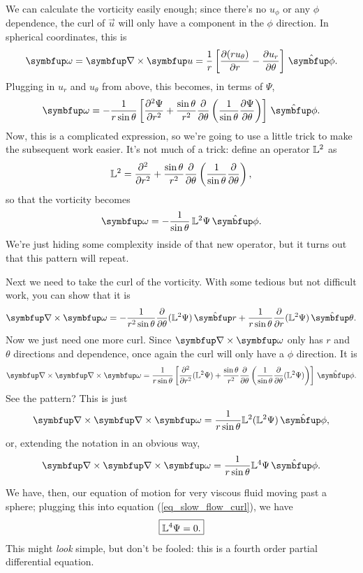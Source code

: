We can calculate the vorticity easily enough; since there's no $u_\phi$ or any $\phi$ dependence, the curl of $\vec{u}$ will only have a component in the $\unit{\phi}$ direction.  In spherical coordinates, this is
\begin{equation}
\vec{\omega} = \grad \times \vec{u} = \frac{1}{r} \left[ \dfdx{(r u_\theta)}{r}  - \dfdx{u_r}{\theta} \right] \, \unit{\phi}.
\end{equation}
Plugging in $u_r$ and $u_\theta$ from above, this becomes, in terms of $\Psi$,
\[
\vec{\omega} = -\frac{1}{r\sin\theta} \left[ \ddfdx{\Psi}{r} + \frac{\sin\theta}{r^2} \dfdx{}{\theta} \left( \frac{1}{\sin\theta} \dfdx{\Psi}{\theta} \right) \right] \, \unit{\phi}.
\]
Now, this is a complicated expression, so we're going to use a little trick to make the subsequent work easier.  It's not much of a trick: define an operator $\mathbb{L}^2$ as 
\begin{equation}
\mathbb{L}^2 = \frac{\partial^2 {}}{\partial {r}^2} + \frac{\sin\theta}{r^2} \frac{\partial {}}{\partial {\theta}} \left( \frac{1}{\sin\theta} \frac{\partial {}}{\partial {\theta}} \right),
\end{equation}
so that the vorticity becomes
\[
\vec{\omega} = -\frac{1}{\sin\theta} \, \LL \Psi \, \unit{\phi}.
\]
We're just hiding some complexity inside of that new operator, but it turns out that this pattern will repeat.

Next we need to take the curl of the vorticity.  With some tedious but not difficult work, you can show that it is
\begin{equation}
\label{eq_curl_vort}
\grad \times \vec{\omega} = -\frac{1}{r^2 \sin\theta} \dfdx{}{\theta} (\LL \Psi) \, \unit{r} + \frac{1}{r\sin\theta} \dfdx{}{r} ( \LL\Psi) \, \unit{\theta}.
\end{equation}
Now we just need one more curl.  Since $\grad \times \vec{\omega}$ only has $r$ and $\theta$ directions and dependence, once again the curl will only have a $\unit{\phi}$ direction.  It is
\[
\grad \times \grad \times \vec{\omega} = \frac{1}{r \sin\theta} \left[ \ddfdx{}{r} (\LL \Psi) + \frac{\sin \theta}{r^2} \dfdx{}{\theta} \left( \frac{1}{\sin\theta} \dfdx{}{\theta} (\LL \Psi) \right) \right] \, \unit{\phi}.
\]
See the pattern?  This is just
\[
\grad \times \grad \times \vec{\omega} = \frac{1}{r \sin\theta} \LL (\LL \Psi) \, \unit{\phi},
\]
or, extending the notation in an obvious way,
\[
\grad \times \grad \times \vec{\omega} = \frac{1}{r \sin\theta} \LLLL \Psi \, \unit{\phi}.
\]

We have, then, our equation of motion for very viscous fluid moving past a sphere; plugging this into equation (\ref{eq_slow_flow_curl}), we have
\begin{equation}
\label{eq_slow_flow_psi}
\boxed{
\mathbb{L}^4 \Psi = 0.
}
\end{equation}
This might \emph{look} simple, but don't be fooled:  this is a fourth order partial differential equation.


